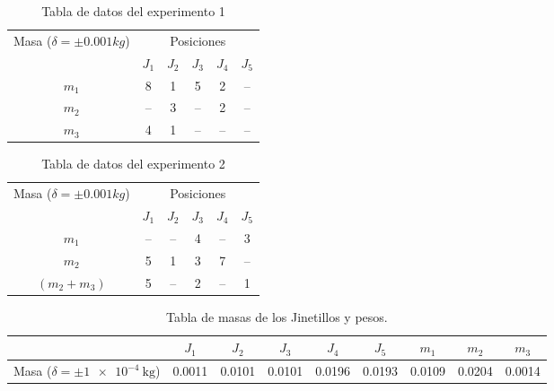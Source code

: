 \documentclass[../main.tex]{subfiles}
\begin{document}
\begin{table}[H]
    \centering
    \begin{tabular}{cccccc}
        \toprule
        \multirow{2}{*}{Masa ($\delta = \pm 0.001kg$)}
         & \multicolumn{5}{c}{Posiciones}\\
        \cmidrule{2-6}
              &  $J_1$  &  $J_2$  &  $J_3$  &  $J_4$  &  $J_5$ \\
        \midrule
        $m_1$ &  8   &  1   &  5   &  2   &  -- \\
        $m_2$ &  --  &  3   &  --  &  2   &  -- \\
        $m_3$ &  4   &  1   &  --  &  --  &  -- \\
        \bottomrule
    \end{tabular}
    \caption{Tabla de datos del experimento 1}
    \label{ref:table1}
\end{table}

\begin{table}[H]
    \centering
    \begin{tabular}{cccccc}
        \toprule
        \multirow{2}{*}{Masa ($\delta = \pm 0.001kg$)}
         & \multicolumn{5}{c}{Posiciones}\\
        \cmidrule{2-6}
             &  $J_1$  &  $J_2$  &  $J_3$  &  $J_4$  &  $J_5$ \\
        \midrule
        $m_1$ &  --  &  --   &  4  &  --  &  3 \\
        $m_2$ &  5   &  1    &  3  &  7   &  -- \\
        $(m_2 + m_3)$  &  5   &  --  &  2  &  --  &  1 \\
        \bottomrule
    \end{tabular}
    \caption{Tabla de datos del experimento 2}
    \label{ref:table2}
\end{table}

\begin{table}[H]
    \centering
    \begin{tabular}{ccccccccc}
    \cmidrule{2-9}
                                      &  $J_1$   &  $J_2$    &  $J_3$    &  $J_4$   &  $J_5$  & $m_1 $  & $m_2 $  & $m_3$\\
        \midrule
      Masa ($\delta = \pm \qty{1e-4}{\kilo\gram}$) &  0.0011  &  0.0101  &  0.0101  &  0.0196 & 0.0193 & 0.0109 & 0.0204 & 0.0014 \\
    \bottomrule
    \end{tabular}
    \caption{Tabla de masas de los Jinetillos y pesos.}
    \label{ref:table3}
\end{table}
\end{document}
